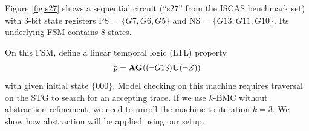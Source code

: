 \begin{Example}

\begin{figure}[H]
\end{figure}

Figure \ref{fig:s27} shows a sequential circuit (``s27'' from the
ISCAS benchmark set) with 3-bit state registers
PS = $\{G7,G6,G5\}$ and NS = $\{G13,G11,G10\}$. 
Its underlying FSM contains 8 states. 

\begin{figure}[H]
\end{figure}

On this FSM, define a linear temporal logic (LTL) property 
$$p = {\bf AG}( (\neg G13) {\bf U} (\neg Z) )$$ 
with given initial state $\{000\}$. Model checking on this machine requires
traversal on the STG to search for an accepting trace. If we use $k$-BMC
without abstraction refinement, we need to unroll the machine to
iteration  $k=3$. We show how abstraction will be applied using our
setup.


\end{Example}
